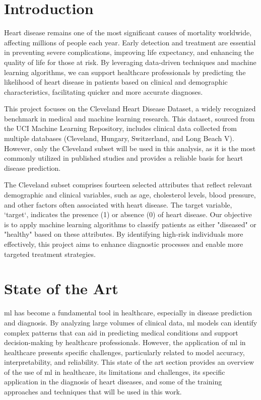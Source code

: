\section{Introduction}
\label{sec:Introduction}
Heart disease remains one of the most significant causes of mortality worldwide, affecting millions of people each year. Early detection and treatment are essential in preventing severe complications, improving life expectancy, and enhancing the quality of life for those at risk. By leveraging data-driven techniques and machine learning algorithms, we can support healthcare professionals by predicting the likelihood of heart disease in patients based on clinical and demographic characteristics, facilitating quicker and more accurate diagnoses.

This project focuses on the Cleveland Heart Disease Dataset, a widely recognized benchmark in medical and machine learning research. This dataset, sourced from the UCI Machine Learning Repository, includes clinical data collected from multiple databases (Cleveland, Hungary, Switzerland, and Long Beach V). However, only the Cleveland subset will be used in this analysis, as it is the most commonly utilized in published studies and provides a reliable basis for heart disease prediction.

The Cleveland subset comprises fourteen selected attributes that reflect relevant demographic and clinical variables, such as age, cholesterol levels, blood pressure, and other factors often associated with heart disease. The target variable, `target`, indicates the presence (1) or absence (0) of heart disease. Our objective is to apply machine learning algorithms to classify patients as either "diseased" or "healthy" based on these attributes. By identifying high-risk individuals more effectively, this project aims to enhance diagnostic processes and enable more targeted treatment strategies.

\section{State of the Art} \label{sec}
\acrfull{ml} has become a fundamental tool in healthcare, especially in disease prediction and diagnosis. By analyzing large volumes of clinical data, \acrshort{ml} models can identify complex patterns that can aid in predicting medical conditions and support decision-making by healthcare professionals. However, the application of \acrshort{ml} in healthcare presents specific challenges, particularly related to model accuracy, interpretability, and reliability. This state of the art section provides an overview of the use of \acrshort{ml} in healthcare, its limitations and challenges, its specific application in the diagnosis of heart diseases, and some of the training approaches and techniques that will be used in this work.

